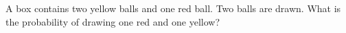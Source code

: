 A box contains two yellow balls and one red ball. Two balls are drawn. What is the probability of drawing one red and one yellow?
